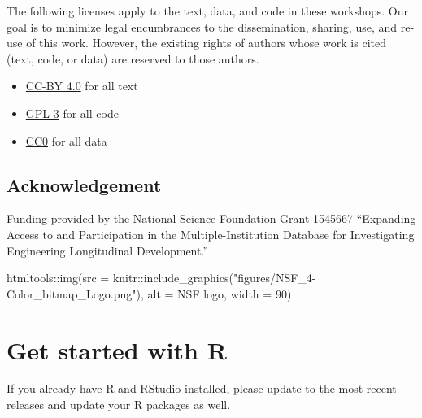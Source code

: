 \documentclass[
]{book}
\newenvironment{Shaded}{\begin{snugshade}}{\end{snugshade}}
\newcommand{\AttributeTok}[1]{\textcolor[rgb]{0.77,0.63,0.00}{#1}}
\newcommand{\DecValTok}[1]{\textcolor[rgb]{0.00,0.00,0.81}{#1}}
\newcommand{\FunctionTok}[1]{\textcolor[rgb]{0.00,0.00,0.00}{#1}}
\newcommand{\NormalTok}[1]{#1}
\newcommand{\SpecialCharTok}[1]{\textcolor[rgb]{0.00,0.00,0.00}{#1}}
\newcommand{\StringTok}[1]{\textcolor[rgb]{0.31,0.60,0.02}{#1}}
\providecommand{\tightlist}{%
  \setlength{\itemsep}{0pt}\setlength{\parskip}{0pt}}
\begin{document}
The following licenses apply to the text, data, and code in these workshops. Our goal is to minimize legal encumbrances to the dissemination, sharing, use, and re-use of this work. However, the existing rights of authors whose work is cited (text, code, or data) are reserved to those authors.

\begin{itemize}
\tightlist
\item
  \href{https://creativecommons.org/licenses/by/4.0/legalcode}{CC-BY 4.0} for all text\\
\item
  \href{https://www.r-project.org/Licenses/GPL-3}{GPL-3} for all code\\
\item
  \href{https://wiki.creativecommons.org/wiki/CC0_use_for_data}{CC0} for all data
\end{itemize}

\hypertarget{acknowledgement}{%
\section*{Acknowledgement}\label{acknowledgement}}

Funding provided by the National Science Foundation Grant 1545667 ``Expanding Access to and Participation in the Multiple-Institution Database for Investigating Engineering Longitudinal Development.''

\begin{Shaded}
\begin{Highlighting}[]
\NormalTok{htmltools}\SpecialCharTok{::}\FunctionTok{img}\NormalTok{(}\AttributeTok{src =} 
\NormalTok{knitr}\SpecialCharTok{::}\FunctionTok{include\_graphics}\NormalTok{(}\StringTok{"figures/NSF\_4{-}Color\_bitmap\_Logo.png"}\NormalTok{), }
               \AttributeTok{alt =} \StringTok{\textquotesingle{}NSF logo\textquotesingle{}}\NormalTok{, }
               \AttributeTok{width =} \DecValTok{90}\NormalTok{)}
\end{Highlighting}
\end{Shaded}

\hypertarget{get-start-r}{%
\chapter{Get started with R}\label{get-start-r}}

If you already have R and RStudio installed, please update to the most recent releases and update your R packages as well.
\end{document}
